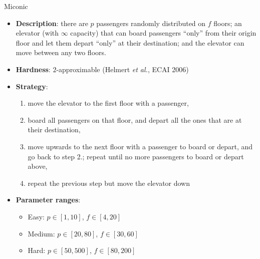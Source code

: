 \documentclass[aspectratio=169,xcolor=dvipsnames]{beamer}
\begin{document}
\begin{frame}{Miconic}
    \begin{itemize}
        \item \textbf{Description}: there are $p$ passengers randomly distributed on $f$ floors; an elevator (with $\infty$ capacity) that can board passengers ``only'' from their origin floor and let them depart ``only'' at their destination; and the elevator can move between any two floors.
        \item \textbf{Hardness}: $2$-approximable (Helmert \textit{et al.}, ECAI 2006)
        \item \textbf{Strategy}:
        \begin{enumerate}
            \item move the elevator to the first floor with a passenger,
            \item board all passengers on that floor, and depart all the ones that are at their destination,
            \item move upwards to the next floor with a passenger to board or depart, and go back to step 2.; repeat until no more passengers to board or depart above,
            \item repeat the previous step but move the elevator down
        \end{enumerate}
        \item \textbf{Parameter ranges}:
        \begin{itemize}
            \item Easy: $p\in[1, 10]$, $f \in [4, 20]$
            \item Medium: $p\in[20, 80]$, $f \in [30, 60]$
            \item Hard: $p\in[50, 500]$, $f \in [80, 200]$
        \end{itemize}
    \end{itemize}
\end{frame}
\end{document}
